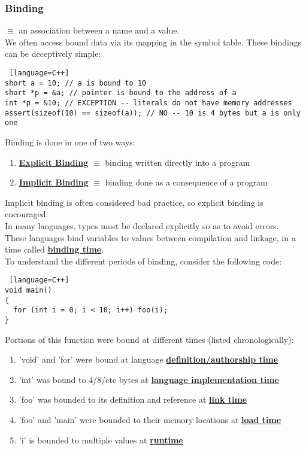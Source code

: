 \documentclass[../../lecture_notes.tex]{subfiles}
\begin{document}
\subsubsection*{Binding}
$\equiv$ an association between a name and a value.\\
We often access bound data via its mapping in the symbol table.  These bindings can be deceptively simple:
\begin{lstlisting} [language=C++]
short a = 10; // a is bound to 10
short *p = &a; // pointer is bound to the address of a
int *p = &10; // EXCEPTION -- literals do not have memory addresses
assert(sizeof(10) == sizeof(a)); // NO -- 10 is 4 bytes but a is only one
\end{lstlisting}
Binding is done in one of two ways:
\begin{enumerate} [itemsep=0mm]
	\item \textbf{\underline{Explicit Binding}} $\equiv$ binding written directly into a program
	\item \textbf{\underline{Implicit Binding}} $\equiv$ binding done as a consequence of a program
\end{enumerate}
Implicit binding is often considered bad practice, so explicit binding is encouraged.\\
In many languages, types must be declared explicitly so as to avoid errors.\\
These languages bind variables to values between compilation and linkage, 
	in a time called \textbf{\underline{binding time}}.\\
To understand the different periods of binding, consider the following code:
\begin{lstlisting} [language=C++]
void main() 
{
  for (int i = 0; i < 10; i++) foo(i);
}
\end{lstlisting}
Portions of this function were bound at different times (listed chronologically):
\begin{enumerate} [itemsep=0mm]
	\item 'void' and 'for' were bound at language \textbf{\underline{definition/authorship time}}
	\item 'int' was bound to 4/8/etc bytes at \textbf{\underline{language implementation time}}
	\item 'foo' was bounded to its definition and reference at \textbf{\underline{link time}}
	\item 'foo' and 'main' were bounded to their memory locations at \textbf{\underline{load time}}
	\item 'i' is bounded to multiple values at \textbf{\underline{runtime}}
\end{enumerate}
\end{document}
